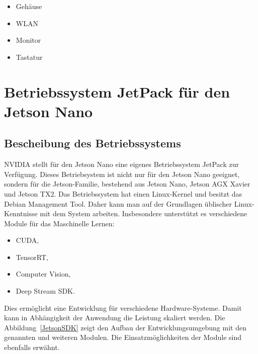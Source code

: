 \begin{itemize}
	\item Gehäuse
	\item WLAN
	\item Monitor
	\item Tastatur
\end{itemize}


\section{Betriebssystem JetPack für den Jetson Nano}

\subsection{Bescheibung des Betriebssystems}

NVIDIA stellt für den Jetson Nano eine eigenes Betriebssystem  \glqq JetPack\grqq{} zur Verfügung. Dieses Betriebsystem ist nicht nur für den Jetson Nano geeignet, sondern für die Jetson-Familie, bestehend aus  Jetson Nano, Jetson AGX Xavier und Jetson TX2.
Das Betriebssystem hat einen Linux-Kernel und besitzt das Debian Management Tool. Daher kann man auf der Grundlagen üblischer Linux-Kenntnisse mit dem System arbeiten. Insbesondere unterstützt es verschiedene Module für das Maschinelle Lernen:

\begin{itemize}
  \item CUDA, 
  \item TensorRT, 
  \item Computer Vision, 
  \item Deep Stream SDK.
\end{itemize}  

Dies ermöglicht eine Entwicklung für verschiedene Hardware-Systeme. Damit kann in Abhängigkeit der Anwendung die Leistung skaliert werden. \cite{Artamonov:2018,jetpack:2021} Die Abbildung~\ref{JetsonSDK} zeigt den Aufbau der Entwicklungsumgebung mit den genannten und weiteren Modulen. Die Einsatzmöglichkeiten der Module sind ebenfalls erwähnt.




